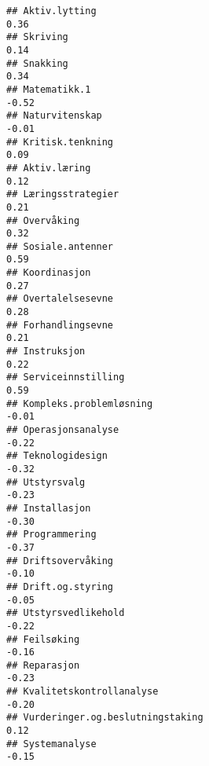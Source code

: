 \documentclass[
]{article}
\begin{document}
\begin{verbatim}
## Aktiv.lytting                                                                     0.36
## Skriving                                                                          0.14
## Snakking                                                                          0.34
## Matematikk.1                                                                     -0.52
## Naturvitenskap                                                                   -0.01
## Kritisk.tenkning                                                                  0.09
## Aktiv.læring                                                                      0.12
## Læringsstrategier                                                                 0.21
## Overvåking                                                                        0.32
## Sosiale.antenner                                                                  0.59
## Koordinasjon                                                                      0.27
## Overtalelsesevne                                                                  0.28
## Forhandlingsevne                                                                  0.21
## Instruksjon                                                                       0.22
## Serviceinnstilling                                                                0.59
## Kompleks.problemløsning                                                          -0.01
## Operasjonsanalyse                                                                -0.22
## Teknologidesign                                                                  -0.32
## Utstyrsvalg                                                                      -0.23
## Installasjon                                                                     -0.30
## Programmering                                                                    -0.37
## Driftsovervåking                                                                 -0.10
## Drift.og.styring                                                                 -0.05
## Utstyrsvedlikehold                                                               -0.22
## Feilsøking                                                                       -0.16
## Reparasjon                                                                       -0.23
## Kvalitetskontrollanalyse                                                         -0.20
## Vurderinger.og.beslutningstaking                                                  0.12
## Systemanalyse                                                                    -0.15

\end{verbatim}
\end{document}
